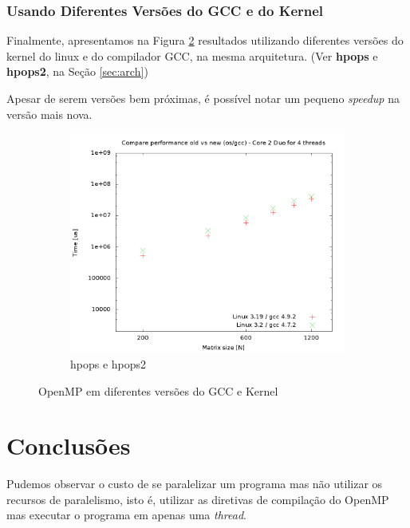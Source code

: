 \documentclass[a4paper, 12pt]{article}
\begin{document}
\subsubsection{Usando Diferentes Versões do GCC e do Kernel}

Finalmente, apresentamos na Figura \ref{fig:cmpv} resultados utilizando 
diferentes versões do kernel do linux e do compilador GCC, na mesma 
arquitetura. (Ver \textbf{hpops} e \textbf{hpops2}, na Seção \ref{sec:arch})

Apesar de serem versões bem próximas, é possível notar um pequeno
\textit{speedup} na versão mais nova.

\begin{figure}[H]
    \centering
    \begin{subfigure}[H]{0.5\textwidth}
        \includegraphics[width=\textwidth]{compare_old_new_os}
        \caption{hpops e hpops2}
        \label{fig:hpops_hpops2}
    \end{subfigure}%
    \caption{OpenMP em diferentes versões do GCC e Kernel}\label{fig:cmpv}
\end{figure}

\newpage
\section{Conclusões} \label{sec:dis}

Pudemos observar o custo de se paralelizar um programa
mas não utilizar os recursos de paralelismo, isto é,
utilizar as diretivas de compilação do OpenMP mas
executar o programa em apenas uma \textit{thread}.
\end{document}
